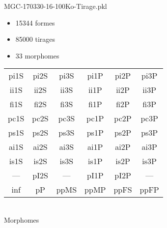 MGC-170330-16-100Ko-Tirage.pkl
\begin{itemize}
\item 15344 formes
\item 85000 tirages
\item 33 morphomes
\end{itemize}
\begin{center}
\begin{tabular}{cccccc}
\hline
\cellcolor{white}pi1S & \cellcolor{orange}pi2S & \cellcolor{orange}pi3S & \cellcolor{white}pi1P & \cellcolor{white}pi2P & \cellcolor{white}pi3P\\
\cellcolor{brown}ii1S & \cellcolor{brown}ii2S & \cellcolor{brown}ii3S & \cellcolor{white}ii1P & \cellcolor{white}ii2P & \cellcolor{brown}ii3P\\
\cellcolor{yellow}fi1S & \cellcolor{lime}fi2S & \cellcolor{lime}fi3S & \cellcolor{green}fi1P & \cellcolor{white}fi2P & \cellcolor{green}fi3P\\
\cellcolor{yellow}pc1S & \cellcolor{yellow}pc2S & \cellcolor{yellow}pc3S & \cellcolor{white}pc1P & \cellcolor{white}pc2P & \cellcolor{yellow}pc3P\\
\cellcolor{teal}ps1S & \cellcolor{teal}ps2S & \cellcolor{teal}ps3S & \cellcolor{white}ps1P & \cellcolor{white}ps2P & \cellcolor{teal}ps3P\\
\cellcolor{white}ai1S & \cellcolor{lightgray}ai2S & \cellcolor{lightgray}ai3S & \cellcolor{white}ai1P & \cellcolor{blue}ai2P & \cellcolor{white}ai3P\\
\cellcolor{pink}is1S & \cellcolor{white}is2S & \cellcolor{lightgray}is3S & \cellcolor{white}is1P & \cellcolor{black}is2P & \cellcolor{pink}is3P\\
--- & \cellcolor{white}pI2S & --- & \cellcolor{white}pI1P & \cellcolor{blue}pI2P & ---\\
\cellcolor{white}inf & \cellcolor{white}pP & \cellcolor{white}ppMS & \cellcolor{white}ppMP & \cellcolor{white}ppFS & \cellcolor{white}ppFP\\
\hline
\end{tabular}\\
Morphomes
\end{center}
\bigskip

